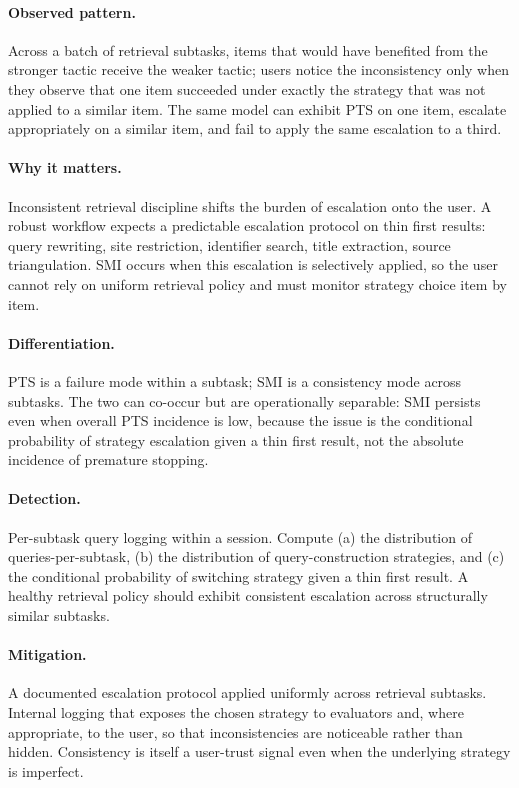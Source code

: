 \documentclass[11pt]{article}
\begin{document}
\paragraph{Observed pattern.} Across a batch of retrieval subtasks, items that would have benefited from the stronger tactic receive the weaker tactic; users notice the inconsistency only when they observe that one item succeeded under exactly the strategy that was not applied to a similar item. The same model can exhibit PTS on one item, escalate appropriately on a similar item, and fail to apply the same escalation to a third.

\paragraph{Why it matters.} Inconsistent retrieval discipline shifts the burden of escalation onto the user. A robust workflow expects a predictable escalation protocol on thin first results: query rewriting, site restriction, identifier search, title extraction, source triangulation. SMI occurs when this escalation is selectively applied, so the user cannot rely on uniform retrieval policy and must monitor strategy choice item by item.

\paragraph{Differentiation.} PTS is a failure mode within a subtask; SMI is a consistency mode across subtasks. The two can co-occur but are operationally separable: SMI persists even when overall PTS incidence is low, because the issue is the conditional probability of strategy escalation given a thin first result, not the absolute incidence of premature stopping.

\paragraph{Detection.} Per-subtask query logging within a session. Compute (a) the distribution of queries-per-subtask, (b) the distribution of query-construction strategies, and (c) the conditional probability of switching strategy given a thin first result. A healthy retrieval policy should exhibit consistent escalation across structurally similar subtasks.

\paragraph{Mitigation.} A documented escalation protocol applied uniformly across retrieval subtasks. Internal logging that exposes the chosen strategy to evaluators and, where appropriate, to the user, so that inconsistencies are noticeable rather than hidden. Consistency is itself a user-trust signal even when the underlying strategy is imperfect.
\end{document}
